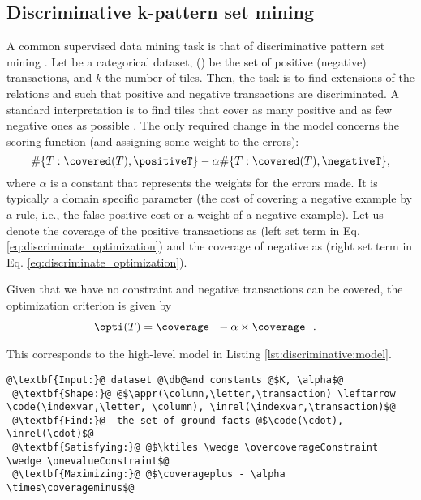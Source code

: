 \subsection{Discriminative k-pattern set mining}
\label{subsec:discriminative}
A common supervised data mining task is that of discriminative pattern set mining \parencite{DBLP:conf/pkdd/KnobbeH06}.  Let \dbvars be a categorical dataset, \positiveT (\negativeT) be the set of positive (negative) transactions, and $ k$ the number of tiles. Then, the task is to find extensions of the relations \codevars and \invars such that positive and negative transactions are discriminated. A standard interpretation is to find tiles that cover as many positive and as few negative ones as possible \parencite{Liu98integratingclassification}. The only required change in the model concerns the scoring function (and assigning some weight to the errors):
\begin{equation}
  \#\{T: \covered(T),\positiveT \} - \alpha \#\{ T: \covered(T),\negativeT \}, \label{eq:discriminate_optimization}
\end{equation}
where $\alpha$ is a constant that represents the weights for the errors made. It is typically a domain specific parameter (the cost of covering a negative example by a rule, i.e., the false
positive cost or a weight of a negative example).
Let us denote the coverage of the positive transactions as \coverageplus (left set term in Eq. \ref{eq:discriminate_optimization}) and the coverage of negative as \coverageminus (right set term in Eq. \ref{eq:discriminate_optimization}).  

Given that we have no \overcoverageConstraint constraint and negative transactions can be covered, the optimization criterion is given by
\begin{align*}
  & \opti(T) = \coverage^+ - \alpha \times \coverage^- .
\end{align*}

This corresponds to the high-level model in Listing \ref{lst:discriminative:model}.
\begin{lstlisting}[style=model,label=lst:discriminative:model,caption=ReDF Discriminative Patter Set Mining Model]
 @\textbf{Input:}@ dataset @\db@and constants @$K, \alpha$@
 @\textbf{Shape:}@ @$\appr(\column,\letter,\transaction) \leftarrow \code(\indexvar,\letter, \column), \inrel(\indexvar,\transaction)$@
 @\textbf{Find:}@  the set of ground facts @$\code(\cdot), \inrel(\cdot)$@
 @\textbf{Satisfying:}@ @$\ktiles \wedge \overcoverageConstraint \wedge \onevalueConstraint$@
 @\textbf{Maximizing:}@ @$\coverageplus - \alpha \times\coverageminus$@
\end{lstlisting}
